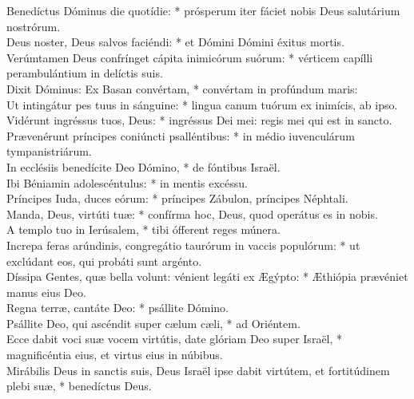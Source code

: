 {	Benedíctus Dóminus die quotídie: * prósperum iter fáciet nobis Deus salutárium nostrórum. \\
	Deus noster, Deus salvos faciéndi: * et Dómini Dómini éxitus mortis. \\
	Verúmtamen Deus confrínget cápita inimicórum suórum: * vérticem capílli perambulántium in delíctis suis. \\
	Dixit Dóminus: Ex Basan convértam, * convértam in profúndum maris: \\
	Ut intingátur pes tuus in sánguine: * lingua canum tuórum ex inimícis, ab ipso. \\
	Vidérunt ingréssus tuos, Deus: * ingréssus Dei mei: regis mei qui est in sancto. \\
	Prævenérunt príncipes coniúncti psalléntibus: * in médio iuvenculárum tympanistriárum. \\
	In ecclésiis benedícite Deo Dómino, * de fóntibus Israël. \\
	Ibi Béniamin adolescéntulus: * in mentis excéssu. \\
	Príncipes Iuda, duces eórum: * príncipes Zábulon, príncipes Néphtali. \\
	Manda, Deus, virtúti tuæ: * confírma hoc, Deus, quod operátus es in nobis. \\
	A templo tuo in Ierúsalem, * tibi ófferent reges múnera. \\
	Increpa feras arúndinis, congregátio taurórum in vaccis populórum: * ut exclúdant eos, qui probáti sunt argénto. \\
	Díssipa Gentes, quæ bella volunt: vénient legáti ex Ægýpto: * Æthiópia prævéniet manus eius Deo. \\
	Regna terræ, cantáte Deo: * psállite Dómino. \\
	Psállite Deo, qui ascéndit super cælum cæli, * ad Oriéntem. \\
	Ecce dabit voci suæ vocem virtútis, date glóriam Deo super Israël, * magnificéntia eius, et virtus eius in núbibus. \\
	Mirábilis Deus in sanctis suis, Deus Israël ipse dabit virtútem, et fortitúdinem plebi suæ, * benedíctus Deus. \\
}

